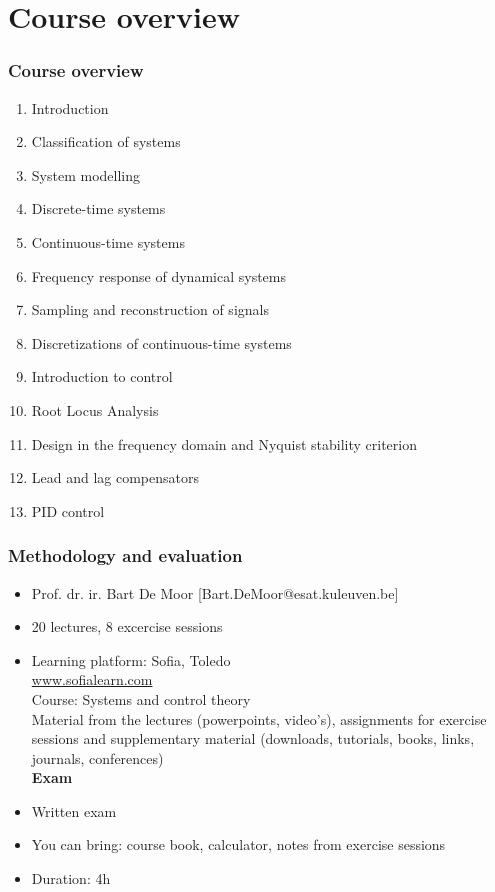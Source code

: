 \section{Course overview} 

\begin{frame}
	\frametitle{Course overview}
	\begin{enumerate}
		\item Introduction
		\item Classification of systems
		\item System modelling
		\item Discrete-time systems
		\item Continuous-time systems
		\item Frequency response of dynamical systems
		\item Sampling and reconstruction of signals
		\item Discretizations of continuous-time systems
		\item Introduction to control
		\item Root Locus Analysis
		\item Design in the frequency domain and Nyquist stability criterion
		\item Lead and lag compensators
		\item PID control
	\end{enumerate}
\end{frame}

\begin{frame}
	\frametitle{Methodology and evaluation}
	\begin{itemize}
		\item Prof. dr. ir. Bart De Moor ‎[Bart.DeMoor@esat.kuleuven.be]‎
		\item 20 lectures, 8 excercise sessions\\
		\item Learning platform: Sofia, Toledo\\
		\url{www.sofialearn.com}\\
		Course: Systems and control theory\\
		Material from the lectures (powerpoints, video's), assignments for exercise sessions and supplementary material (downloads, tutorials, books, links, journals, conferences)\\
		\bigskip
		\textbf{Exam}
		\item Written exam
		\item You can bring: course book, calculator, notes from exercise sessions
		\item Duration: 4h
	\end{itemize}
\end{frame}

